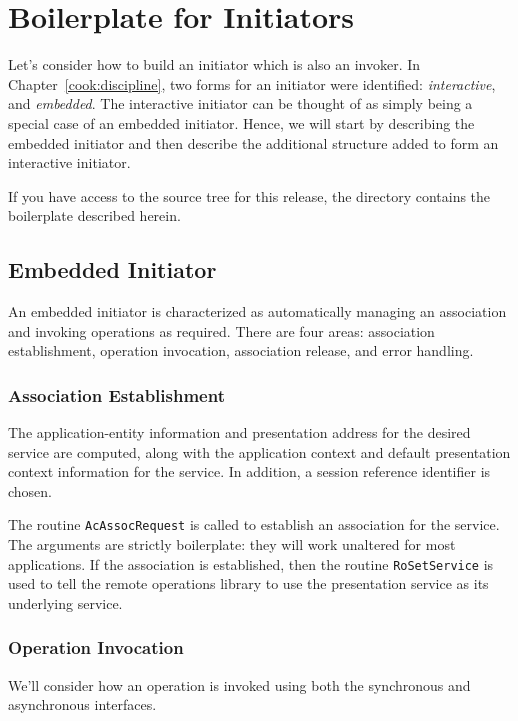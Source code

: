 
\chapter       {Boilerplate for Initiators}\label{cook:initiator}
Let's consider how to build an initiator which is also an invoker.
In Chapter~\ref{cook:discipline},
two forms for an initiator were identified:
{\em interactive}, and {\em embedded}.
The interactive initiator can be thought of as simply being a special case of
an embedded initiator.
Hence,
we will start by describing the embedded initiator and then describe the
additional structure added to form an interactive initiator.

If you have access to the source tree for this release,
the directory  contains the boilerplate described herein.

\section	{Embedded Initiator}
An embedded initiator is characterized as automatically managing an association
and invoking operations as required.
There are four areas: association establishment, operation invocation,
association release, and error handling.

\subsection	{Association Establishment}
The application-entity information and presentation address for the desired
service are computed,
along with the application context and default presentation context
information for the service.
In addition,
a session reference identifier is chosen.

The routine \verb"AcAssocRequest" is called to establish an association for
the service.
The arguments are strictly boilerplate:
they will work unaltered for most applications.
If the association is established,
then the routine \verb"RoSetService" is used to tell the remote operations
library to use the presentation service as its underlying service.

\newpage

\subsection	{Operation Invocation}
We'll consider how an operation is invoked using both the synchronous and
asynchronous interfaces.

